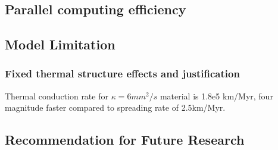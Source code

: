 \subsection{Parallel computing efficiency}

\subsection{Model Limitation}

\subsubsection{Fixed thermal structure effects and justification}
Thermal conduction rate for $\kappa=6mm^{2}/s$ material is 1.8e5 km/Myr, four magnitude faster compared to spreading rate of 2.5km/Myr.

\subsection{Recommendation for Future Research}
